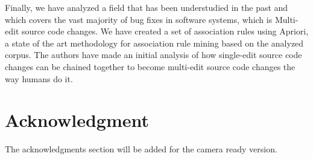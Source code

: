 \documentclass[conference]{IEEEtran}
\begin{document}
Finally, we have analyzed a field that has been understudied in the past and which covers 
the vast majority of bug fixes in software systems, which is Multi-edit source code changes. 
We have created a set of association rules using Apriori, a state of the art
methodology for association rule mining based on the analyzed corpus. The authors have
made an initial analysis of how single-edit source code changes can be chained together 
to become multi-edit source code changes the way humans do it.





\section*{Acknowledgment}
The acknowledgments section will be added for the camera ready version. 







%
%
%







\end{document}
